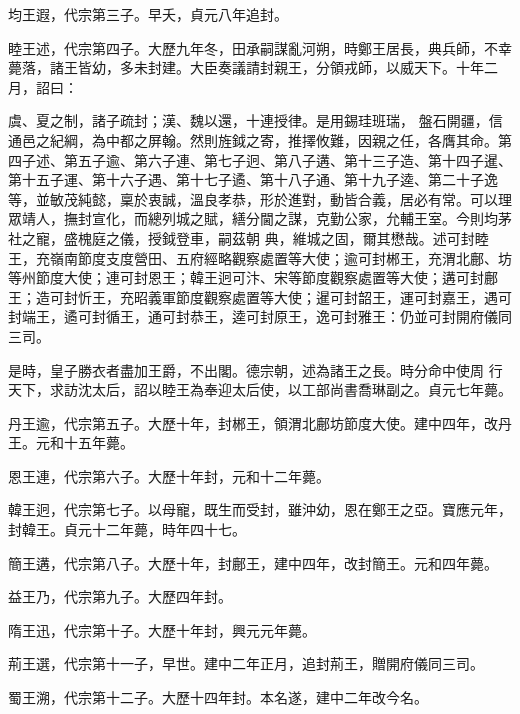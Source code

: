 \begin{pinyinscope}
 均王遐，代宗第三子。早夭，貞元八年追封。



 睦王述，代宗第四子。大歷九年冬，田承嗣謀亂河朔，時鄭王居長，典兵師，不幸薨落，諸王皆幼，多未封建。大臣奏議請封親王，分領戎師，以威天下。十年二月，詔曰：



 虞、夏之制，諸子疏封；漢、魏以還，十連授律。是用錫珪班瑞，
 盤石開疆，信通邑之紀綱，為中都之屏翰。然則旌鉞之寄，推擇攸難，因親之任，各膺其命。第四子述、第五子逾、第六子連、第七子迥、第八子遘、第十三子造、第十四子暹、第十五子運、第十六子遇、第十七子遹、第十八子通、第十九子逵、第二十子逸等，並敏茂純懿，稟於衷誠，溫良孝恭，形於進對，動皆合義，居必有常。可以理眾靖人，撫封宣化，而總列城之賦，繕分閫之謀，克勤公家，允輔王室。今則均茅社之寵，盛槐庭之儀，授鉞登車，嗣茲朝
 典，維城之固，爾其懋哉。述可封睦王，充嶺南節度支度營田、五府經略觀察處置等大使；逾可封郴王，充渭北鄜、坊等州節度大使；連可封恩王；韓王迥可汴、宋等節度觀察處置等大使；遘可封鄜王；造可封忻王，充昭義軍節度觀察處置等大使；暹可封韶王，運可封嘉王，遇可封端王，遹可封循王，通可封恭王，逵可封原王，逸可封雅王：仍並可封開府儀同三司。



 是時，皇子勝衣者盡加王爵，不出閣。德宗朝，述為諸王之長。時分命中使周
 行天下，求訪沈太后，詔以睦王為奉迎太后使，以工部尚書喬琳副之。貞元七年薨。



 丹王逾，代宗第五子。大歷十年，封郴王，領渭北鄜坊節度大使。建中四年，改丹王。元和十五年薨。



 恩王連，代宗第六子。大歷十年封，元和十二年薨。



 韓王迥，代宗第七子。以母寵，既生而受封，雖沖幼，恩在鄭王之亞。寶應元年，封韓王。貞元十二年薨，時年四十七。



 簡王遘，代宗第八子。大歷十年，封鄜王，建中四年，改封簡王。元和四年薨。



 益王乃，代宗第九子。大歷四年封。



 隋王迅，代宗第十子。大歷十年封，興元元年薨。



 荊王選，代宗第十一子，早世。建中二年正月，追封荊王，贈開府儀同三司。



 蜀王溯，代宗第十二子。大歷十四年封。本名遂，建中二年改今名。




\end{pinyinscope}
